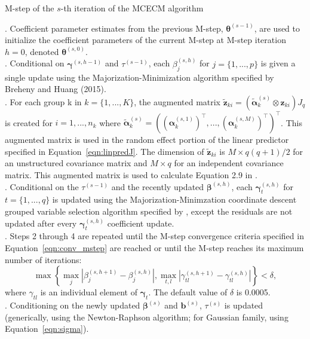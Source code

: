 \begin{algorithm}[h!]
\caption{M-step of the $s$-th iteration of the MCECM algorithm} \label{alg:mstep}
\begin{algorithmic}
. Coefficient parameter estimates from the previous M-step, $\boldsymbol \theta^{(s-1)}$, are used to initialize the coefficient parameters of the current M-step at M-step iteration $h=0$, denoted $\boldsymbol \theta^{(s,0)}$. \\
. Conditional on $\boldsymbol \gamma^{(s,h-1)}$ and $\tau^{(s-1)}$, each $\beta_j^{(s,h)}$ for $j = \{1,...,p\}$ is given a single update using the Majorization-Minimization algorithm specified by Breheny and Huang (2015). \\
. For each group k in $k = \{1,...,K\}$, the augmented matrix $\boldsymbol{\tilde z}_{ki} = (\boldsymbol{\tilde \alpha}_k^{(s)} \otimes \boldsymbol z_{ki}) J_q$ is created for $i = 1,...,n_k$ where $\boldsymbol{\tilde \alpha}_k^{(s)} = ((\boldsymbol \alpha_k^{(s,1)})^\top,...,(\boldsymbol \alpha_k^{(s,M)})^\top)^\top$. This augmented matrix is used in the random effect portion of the linear predictor specified in Equation~\ref{eqn:linpredJ}. The dimension of $\boldsymbol{\tilde z}_{ki}$ is $M \times q(q+1)/2$ for an unstructured covariance matrix and $M \times q$ for an independent covariance matrix. This augmented matrix is used to calculate Equation 2.9 in \cite{grpreg2015}. \\
. Conditional on the $\tau^{(s-1)}$ and the recently updated $\boldsymbol \beta^{(s,h)}$, each $\boldsymbol \gamma_t^{(s,h)}$ for $t = \{1,...,q\}$ is updated using the Majorization-Minimzation coordinate descent grouped variable selection algorithm specified by \cite{grpreg2015}, except the residuals are not updated after every $\boldsymbol \gamma_t^{(s,h)}$ coefficient update. \\
. Steps 2 through 4 are repeated until the M-step convergence criteria specified in Equation~\ref{eqn:conv_mstep} are reached or until the M-step reaches its maximum number of iterations: 
  \begin{equation}
    \max \left \{ \max_j |\beta_j^{(s,h+1)} - \beta_j^{(s,h)}|, \max_{t,l} |\gamma_{tl}^{(s,h+1)} - \gamma_{tl}^{(s,h)}| \right \} < \delta,
    \label{eqn:conv_mstep}
  \end{equation}
where $\gamma_{tl}$ is an individual element of $\boldsymbol \gamma_t$. The default value of $\delta$ is 0.0005.\\
. Conditioning on the newly updated $\boldsymbol \beta^{(s)}$ and $\boldsymbol b^{(s)}$, $\tau^{(s)}$ is updated (generically, using the Newton-Raphson algorithm; for Gaussian family, using Equation~\ref{eqn:sigma}).
\end{algorithmic}
\end{algorithm}

